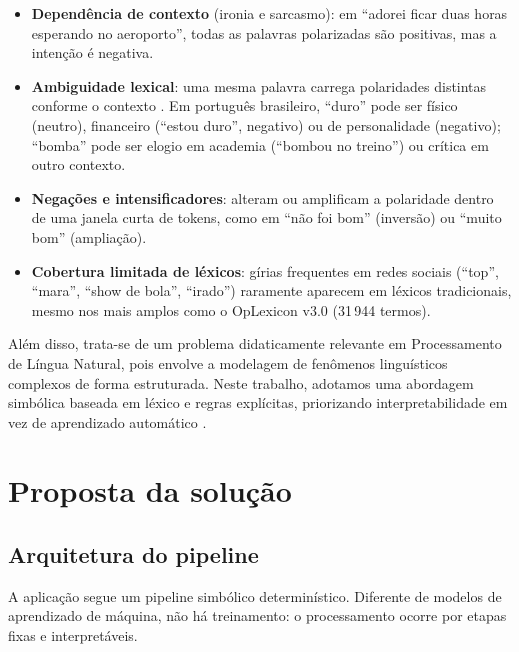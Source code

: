\documentclass[11pt,a4paper]{article}
\begin{document}
\begin{itemize}
  \item \textbf{Dependência de contexto} (ironia e sarcasmo): em ``adorei ficar duas horas esperando no aeroporto'', todas as palavras polarizadas são positivas, mas a intenção é negativa.
  \item \textbf{Ambiguidade lexical}: uma mesma palavra carrega polaridades distintas conforme o contexto \citep{navigli2009wsd}. Em português brasileiro, ``duro'' pode ser físico (neutro), financeiro (``estou duro'', negativo) ou de personalidade (negativo); ``bomba'' pode ser elogio em academia (``bombou no treino'') ou crítica em outro contexto.
  \item \textbf{Negações e intensificadores}: alteram ou amplificam a polaridade dentro de uma janela curta de tokens, como em ``não foi bom'' (inversão) ou ``muito bom'' (ampliação).
  \item \textbf{Cobertura limitada de léxicos}: gírias frequentes em redes sociais (``top'', ``mara'', ``show de bola'', ``irado'') raramente aparecem em léxicos tradicionais, mesmo nos mais amplos como o OpLexicon v3.0 (31\,944 termos).
\end{itemize}

Além disso, trata-se de um problema didaticamente relevante em Processamento de Língua Natural, pois envolve a modelagem de fenômenos linguísticos complexos de forma estruturada. Neste trabalho, adotamos uma abordagem simbólica baseada em léxico e regras explícitas, priorizando interpretabilidade em vez de aprendizado automático \citep{taboada2011lexicon,hutto2014vader,souza2012sentiment}.

\section{Proposta da solução}

\subsection{Arquitetura do pipeline}

A aplicação segue um pipeline simbólico determinístico. Diferente de modelos de aprendizado de máquina, não há treinamento: o processamento ocorre por etapas fixas e interpretáveis.
\end{document}
